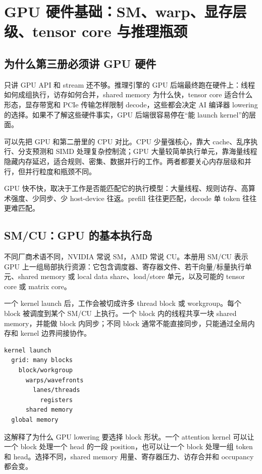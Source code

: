 \section{GPU 硬件基础：SM、warp、显存层级、tensor core 与推理瓶颈}

\subsection{为什么第三册必须讲 GPU 硬件}

只讲 GPU API 和 stream 还不够。推理引擎的 GPU 后端最终跑在硬件上：线程如何成组执行，访存如何合并，shared memory 为什么快，tensor core 适合什么形态，显存带宽和 PCIe 传输怎样限制 decode，这些都会决定 AI 编译器 lowering 的选择。如果不了解这些硬件事实，GPU 后端很容易停在“能 launch kernel”的层面。

可以先把 GPU 和第二册里的 CPU 对比。CPU 少量强核心，靠大 cache、乱序执行、分支预测和 SIMD 处理复杂控制流；GPU 大量较简单执行单元，靠海量线程隐藏内存延迟，适合规则、密集、数据并行的工作。两者都要关心内存层级和并行，但并行粒度和瓶颈不同。

\begin{keyidea}
GPU 快不快，取决于工作是否能匹配它的执行模型：大量线程、规则访存、高算术强度、少同步、少 host-device 往返。prefill 往往更匹配，decode 单 token 往往更难匹配。
\end{keyidea}

\subsection{SM/CU：GPU 的基本执行岛}

不同厂商术语不同，NVIDIA 常说 SM，AMD 常说 CU。本册用 SM/CU 表示 GPU 上一组局部执行资源：它包含调度器、寄存器文件、若干向量/标量执行单元、shared memory 或 local data share、load/store 单元，以及可能的 tensor core 或 matrix core。

一个 kernel launch 后，工作会被切成许多 thread block 或 workgroup。每个 block 被调度到某个 SM/CU 上执行。一个 block 内的线程共享一块 shared memory，并能做 block 内同步；不同 block 通常不能直接同步，只能通过全局内存和 kernel 边界间接协作。

\begin{lstlisting}[numbers=none,caption={GPU 执行层级的简化账本}]
kernel launch
  grid: many blocks
    block/workgroup
      warps/wavefronts
        lanes/threads
          registers
      shared memory
  global memory
\end{lstlisting}

这解释了为什么 GPU lowering 要选择 block 形状。一个 attention kernel 可以让一个 block 处理一个 head 的一段 position，也可以让一个 block 处理一组 token 和 head。选择不同，shared memory 用量、寄存器压力、访存合并和 occupancy 都会变。

